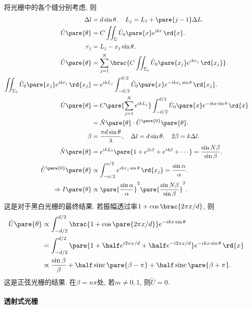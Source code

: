 \documentclass{ctexart}
\DeclareMathOperator{\sinc}{sinc}
\begin{document}
将光栅中的各个缝分别考虑, 则
\begin{align*}
    \Delta l &= d\sin\theta,\quad L_j = L_1 + \pare{j-1}\Delta L. \\
    \tilde{U}\pare{\theta} &= C \iint_\Sigma \tilde{U}_0\pare{x} e^{ikr}\,\rd{x}. \\
    r_j &= L_j - x_j \sin\theta, \\
    \tilde{U}\pare{\theta} &= \sum_{j=1}^N \brac{C\iint_{\Sigma_j} \tilde{U}_0\pare{x_j} e^{ikr_j}\,\rd{x_j}}. \\
    \iint_{\Sigma_j} \tilde{U}_0\pare{x_j} e^{ikr_j}\,\rd{x_j} &= e^{ikL_j} \int_{-d/2}^{d/2} \tilde{U}_0\pare{x} e^{-ikx_j\sin\theta}\,\rd{x_j}. \\
    \tilde{U}\pare{\theta} &= C\pare{\sum_{j=1}^N e^{ikL_j}}\int_{-d/2}^{d/2} \tilde{U}_0\pare{x} e^{-ikx\sin\theta}\,\rd{x} \\
    &= \tilde{N}\pare{\theta} \cdot \tilde{U}^{\pare{0}}\pare{\theta}. \\
    \beta &= \frac{\pi d\sin\theta}{\lambda},\quad \Delta l = d\sin\theta,\quad 2\beta = k\Delta l. \\
    \tilde{N}\pare{\theta} &= e^{ikL_1}\pare{1+e^{2i\beta} + e^{i4\beta}+ \cdots} = \frac{\sin N\beta}{\sin\beta}. \\
    \tilde{U}^{\pare{0}}\pare{\theta} &\propto \int_{-a/2}^{a/2} e^{ikx_j\sin\theta}\,\rd{x_j} = \frac{\sin\alpha}{\alpha}. \\
    \Rightarrow I\pare{\theta} &\propto \pare{\frac{\sin\alpha}{\alpha}}^2\pare{\frac{\sin N\beta}{\sin\beta}}^2.
\end{align*}
这是对于黑白光栅的最终结果. 若振幅透过率$1+\cos\brac{2\pi x/d}$, 则
\begin{align*}
    \tilde{U}\pare{\theta} &\propto \int_{-d/2}^{d/2}\brac{1+\cos\pare{2\pi x/d}} e^{-ikx\sin\theta} \\
    &= \int_{-d/2}^{d/2} \pare{1+\half e^{i2\pi x/d} + \half e^{-i2\pi x/d}} e^{-ikx\sin\theta}\,\rd{x} \\
    &\propto \frac{\sin\beta}{\beta} + \half \sinc\pare{\beta - \pi} + \half \sinc\pare{\beta + \pi}.
\end{align*}
这是正弦光栅的结果. 在$\beta = n\pi$处, 若$m\neq 0,1$, 则$\tilde{U} = 0$.


\paragraph{透射式光栅} %
\label{par:透射式光栅}
\end{document}
